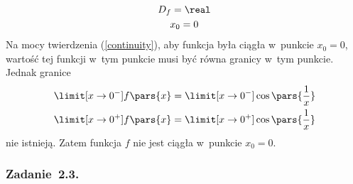 \begin{itemize}
\begin{gather*}
            D_f = \real\\
            x_0 = 0
        \end{gather*}
        Na mocy twierdzenia (\ref{continuity}), aby funkcja była ciągła w~punkcie \(x_0 = 0\), wartość tej funkcji w~tym punkcie musi być równa granicy w~tym punkcie. Jednak granice
        \begin{gather*}
            \limit[x \to 0^-] f\pars{x} = \limit[x \to 0^-] \cos\pars{\frac{1}{x}}\\
            \limit[x \to 0^+] f\pars{x} = \limit[x \to 0^+] \cos\pars{\frac{1}{x}}
        \end{gather*}
        nie istnieją. Zatem funkcja \(f\) nie jest ciągła w~punkcie \(x_0 = 0\).
\end{itemize}
\subsubsection*{Zadanie~2.3.}
